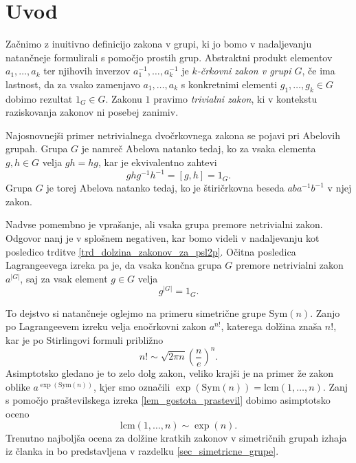 \section{Uvod}
Začnimo z inuitivno definicijo zakona v grupi, ki jo bomo v nadaljevanju natančneje formulirali s pomočjo prostih grup.
Abstraktni produkt elementov $a_1, \ldots , a_k$ ter njihovih inverzov $a_1^{-1}, \ldots , a_k^{-1}$ je \emph{$k$-črkovni zakon v grupi $G$}, če ima lastnost, da za vsako zamenjavo $a_1, \ldots, a_k$ s konkretnimi
elementi $g_1, \ldots, g_k \in G$ dobimo rezultat $1_G\in G$. Zakonu $1$ pravimo \emph{trivialni zakon}, ki v kontekstu raziskovanja zakonov ni posebej zanimiv.

Najosnovnejši primer netrivialnega dvočrkovnega zakona se pojavi pri Abelovih grupah. Grupa $G$ je namreč Abelova natanko tedaj, ko za vsaka elementa $g, h \in  G$ velja $gh = hg$, kar je ekvivalentno
zahtevi \begin{equation*}
ghg^{-1}h^{-1} = [g,h] = 1_G.
\end{equation*}
Grupa $G$ je torej Abelova natanko tedaj, ko je štiričrkovna beseda $aba^{-1}b^{-1}$ v njej zakon. 

Nadvse pomembno je vprašanje, ali vsaka grupa premore netrivialni zakon. Odgovor nanj je v splošnem negativen, kar bomo videli v nadaljevanju kot posledico trditve \ref{trd_dolzina_zakonov_za_psl2p}. 
Očitna posledica Lagrangeevega izreka pa je, da vsaka končna grupa $G$ premore
netrivialni zakon $a^{\lvert G \rvert }$, saj za vsak element $g \in G$ velja  
\begin{equation*}
g^{\lvert G \rvert } = 1_G.
\end{equation*}  

To dejstvo si natančneje oglejmo na primeru simetrične grupe $\text{Sym}(n)$. Zanjo po Lagrangeevem izreku velja enočrkovni zakon $a^{n !}$, katerega dolžina znaša $n!$, kar je po Stirlingovi formuli približno
\begin{equation*}
n! \sim \sqrt{2 \pi n} \left( \frac{n}{e} \right)^{n}.
\end{equation*}  
Asimptotsko gledano je to zelo dolg zakon, veliko krajši je na primer že zakon oblike $a^{\exp(\text{Sym}(n))}$, kjer smo označili $\exp(\text{Sym}(n)) = \text{lcm}(1, \ldots, n)$. Zanj s pomočjo praštevilskega izreka \ref{lem_gostota_prastevil} 
dobimo asimptotsko oceno \begin{equation*}
\text{lcm}(1, \ldots ,n) \sim \exp(n).
\end{equation*}  
Trenutno najboljša ocena za dolžine kratkih zakonov v simetričnih grupah izhaja iz članka \cite{Kozma_Thom_2016} in bo predstavljena v razdelku \ref{sec_simetricne_grupe}.

